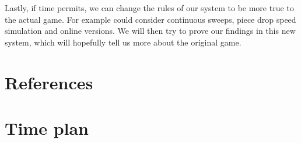 \documentclass[a4paper,10pt]{article}
\begin{document}
Lastly, if time permits, we can change the rules of our system to be more true to the actual game. For example could consider continuous sweeps, piece drop speed simulation and online versions. We will then try to prove our findings in this new system, which will hopefully tell us more about the original game.

\section{References}
\section{Time plan}
\end{document}
